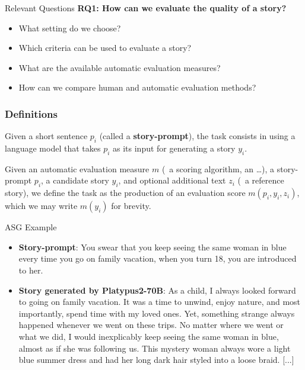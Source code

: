 \begin{frame}{Relevant Questions}
    \textbf{RQ1: How can we evaluate the quality of a story?}
    \begin{itemize}
        \item What setting do we choose?
        \item Which criteria can be used to evaluate a story?
        \item What are the available automatic evaluation measures?
        \item How can we compare human and automatic evaluation methods?
    \end{itemize}
\end{frame}

\begin{frame}
    \frametitle{Definitions}
    \begin{definition}[{\asgfull} ({\asg})]
        Given a short sentence $p_i$ (called a \textbf{story-prompt}), the {\asg} task consists in using a language model that takes $p_i$ as its input for generating a story $y_i$.
    \end{definition}

    \begin{definition}[{\asefull} ({\ase})]
    Given an automatic evaluation measure $m$ ({\eg}\ a scoring algorithm, an \llm\dots), a story-prompt $p_i$, a candidate story $y_i$, and optional additional text $z_i$ ({\eg}\ a reference story), we define the {\ase} task as the production of an evaluation score $m(p_i, y_i, z_i)$, which we may write $m(y_i)$ for brevity.
    \end{definition}
\end{frame}

\begin{frame}{ASG Example}
    \begin{itemize}[<+->]
        \item \textbf{Story-prompt}: You swear that you keep seeing the same woman in blue every time you go on family vacation, when you turn 18, you are introduced to her.
        \item \textbf{Story generated by Platypus2-70B}: As a child, I always looked forward to going on family vacation. It was a time to unwind, enjoy nature, and most importantly, spend time with my loved ones. Yet, something strange always happened whenever we went on these trips. No matter where we went or what we did, I would inexplicably keep seeing the same woman in blue, almost as if she was following us. This mystery woman always wore a light blue summer dress and had her long dark hair styled into a loose braid. [...]
    \end{itemize}
    
\end{frame}

